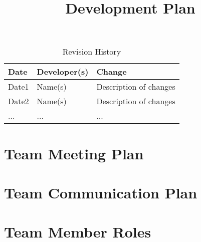 \documentclass{article}
\title{Development Plan\\\progname}
\author{\authname}
\date{}
\begin{document}
\begin{table}[hp]
	\caption{Revision History} \label{TblRevisionHistory}
	\begin{tabularx}{\textwidth}{llX}
		\toprule
		\textbf{Date} & \textbf{Developer(s)} & \textbf{Change}\\
		\midrule
		Date1 & Name(s) & Description of changes\\
		Date2 & Name(s) & Description of changes\\
		... & ... & ...\\
		\bottomrule
	\end{tabularx}
\end{table}

\newpage

\maketitle


\section{Team Meeting Plan}

\section{Team Communication Plan}

\section{Team Member Roles}
\end{document}
